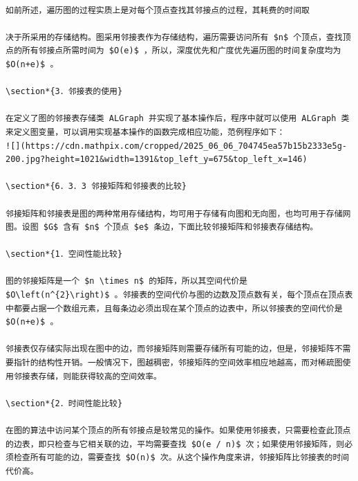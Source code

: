 \documentclass[10pt]{article}
\begin{document}
\begin{verbatim}

如前所述，遍历图的过程实质上是对每个顶点查找其邻接点的过程，其耗费的时间取

决于所采用的存储结构。图采用邻接表作为存储结构，遍历需要访问所有 $n$ 个顶点，查找顶点的所有邻接点所需时间为 $O(e)$ ，所以，深度优先和广度优先遍历图的时间复杂度均为 $O(n+e)$ 。

\section*{3．邻接表的使用}

在定义了图的邻接表存储类 ALGraph 并实现了基本操作后，程序中就可以使用 ALGraph 类来定义图变量，可以调用实现基本操作的函数完成相应功能，范例程序如下：
![](https://cdn.mathpix.com/cropped/2025_06_06_704745ea57b15b2333e5g-200.jpg?height=1021&width=1391&top_left_y=675&top_left_x=146)

\section*{6．3．3 邻接矩阵和邻接表的比较}

邻接矩阵和邻接表是图的两种常用存储结构，均可用于存储有向图和无向图，也均可用于存储网图。设图 $G$ 含有 $n$ 个顶点 $e$ 条边，下面比较邻接矩阵和邻接表存储结构。

\section*{1．空间性能比较}

图的邻接矩阵是一个 $n \times n$ 的矩阵，所以其空间代价是 $O\left(n^{2}\right)$ 。邻接表的空间代价与图的边数及顶点数有关，每个顶点在顶点表中都要占据一个数组元素，且每条边必须出现在某个顶点的边表中，所以邻接表的空间代价是 $O(n+e)$ 。

邻接表仅存储实际出现在图中的边，而邻接矩阵则需要存储所有可能的边，但是，邻接矩阵不需要指针的结构性开销。一般情况下，图越稠密，邻接矩阵的空间效率相应地越高，而对稀疏图使用邻接表存储，则能获得较高的空间效率。

\section*{2．时间性能比较}

在图的算法中访问某个顶点的所有邻接点是较常见的操作。如果使用邻接表，只需要检查此顶点的边表，即只检查与它相关联的边，平均需要查找 $O(e / n)$ 次；如果使用邻接矩阵，则必须检查所有可能的边，需要查找 $O(n)$ 次。从这个操作角度来讲，邻接矩阵比邻接表的时间代价高。


\end{verbatim}
\end{document}
